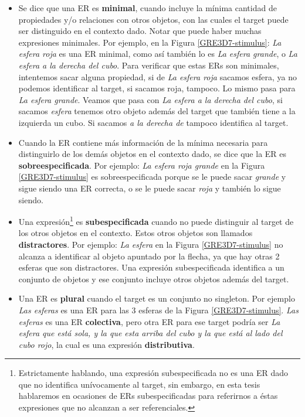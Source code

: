 \begin{itemize}
\item \label{sec:minimales} Se dice que una ER es {\bf minimal}, cuando incluye la m\'inima cantidad de propiedades y/o relaciones con otros objetos, con las cuales el target puede ser distinguido en el contexto dado. Notar que puede haber muchas expresiones minimales. Por ejemplo, en la Figura \ref{GRE3D7-stimulus}: {\it La esfera roja} es una ER minimal, como as\'i tambi\'en lo es {\it La esfera grande}, o {\it La esfera a la derecha del cubo}. Para verificar que estas ERs son minimales, intentemos sacar alguna propiedad, si de {\it La esfera roja} sacamos esfera, ya no podemos identificar al target, si sacamos roja, tampoco. Lo mismo pasa para {\it La esfera grande}. Veamos que pasa con {\it La esfera a la derecha del cubo}, si sacamos {\it esfera} tenemos otro objeto adem\'as del target que tambi\'en tiene a la izquierda un cubo. Si sacamos {\it a la derecha de} tampoco identifica al target. 

\item Cuando la ER contiene m\'as informaci\'on de la m\'inima necesaria para distinguirlo de los dem\'as objetos en el contexto dado, se dice que la ER es {\bf sobreespecificada}. Por ejemplo: {\it La esfera roja grande} en la Figura \ref{GRE3D7-stimulus} es sobreespecificada porque se le puede sacar {\it grande} y sigue siendo una ER correcta, o se le puede sacar {\it roja} y tambi\'en lo sigue siendo. \label{er-sobreespecificadas}

\item Una expresi\'on\footnote{Estrictamente hablando, una expresi\'on subespecificada no es una ER dado que no identifica un\'ivocamente al target, sin embargo, en esta tesis hablaremos en ocasiones de ERs subespecificadas para referirnos a \'estas expresiones que no alcanzan a ser referenciales.} es {\bf subespecificada} cuando no puede distinguir al target de los otros objetos en el contexto. Estos otros objetos son llamados \textbf{distractores}. Por ejemplo: {\it La esfera} en la Figura \ref{GRE3D7-stimulus} no alcanza a identificar al objeto apuntado por la flecha, ya que hay otras 2 esferas que son distractores. Una expresi\'on subespecificada identifica a un conjunto de objetos y ese conjunto incluye otros objetos adem\'as del target.

\item Una ER es {\bf plural} cuando el target es un conjunto no singleton. Por ejemplo {\it Las esferas} es una ER para las 3 esferas de la Figura \ref{GRE3D7-stimulus}. {\it Las esferas} es una ER \textbf{colectiva}, pero otra ER para ese target podr\'ia ser {\it La esfera que est\'a sola, y la que esta arriba del cubo y la que est\'a al lado del cubo rojo}, la cual es una expresi\'on \textbf{distributiva}.


\end{itemize}

